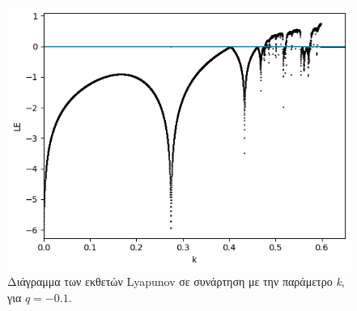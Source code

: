 \begin{figure}[h!]
	\centering
	\includegraphics[width=0.6\linewidth]{"LateX images/graphs/g6 "}
	\caption{Διάγραμμα των εκθετών Lyapunov σε συνάρτηση με την παράμετρο \emph{k}, για $q=-0.1$.}
	\label{f:g7}
\end{figure}


